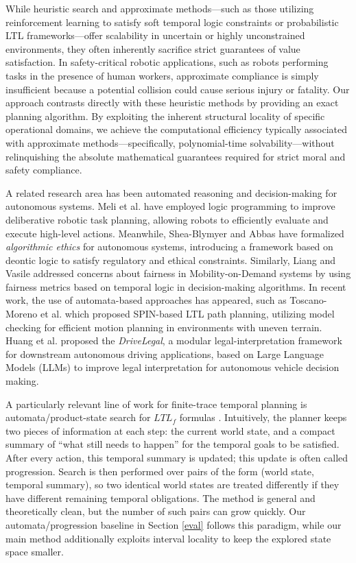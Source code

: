 \documentclass[]{jair}
\begin{document}
While heuristic search and approximate methods—such as those utilizing reinforcement learning to satisfy soft temporal logic constraints or probabilistic LTL frameworks—offer scalability in uncertain or highly unconstrained environments, they often inherently sacrifice strict guarantees of value satisfaction. In safety-critical robotic applications, such as robots performing tasks in the presence of human workers, approximate compliance is simply insufficient because a potential collision could cause serious injury or fatality. Our approach contrasts directly with these heuristic methods by providing an exact planning algorithm. By exploiting the inherent structural locality of specific operational domains, we achieve the computational efficiency typically associated with approximate methods—specifically, polynomial-time solvability—without relinquishing the absolute mathematical guarantees required for strict moral and safety compliance.

A related research area has been automated reasoning and decision-making for autonomous systems. Meli et al. \cite{melilogic} have employed logic programming to improve deliberative robotic task planning, allowing robots to efficiently evaluate and execute high-level actions.
Meanwhile, Shea-Blymyer and Abbas \cite{10.1145/3460975} have formalized {\it algorithmic ethics} for autonomous systems, introducing a framework based on deontic logic \cite{von1951deontic} to satisfy regulatory and ethical constraints. Similarly, 
 Liang and Vasile \cite{fairplanning} addressed concerns about fairness in Mobility-on-Demand systems by using fairness metrics based on temporal logic in decision-making algorithms.
In recent work, the use of automata-based approaches has appeared, such as Toscano-Moreno et al. \cite{li2024spin} which proposed SPIN-based LTL path planning, utilizing model checking for efficient motion planning in environments with uneven terrain. Huang et al. \cite{HUANG2026131593} proposed the \emph{DriveLegal}, a modular legal-interpretation framework for downstream autonomous driving applications, based on Large Language Models (LLMs) to improve legal interpretation for autonomous vehicle decision making.

A particularly relevant line of work for finite-trace temporal planning is automata/product-state search for $LTL_f$ formulas \cite{degiacomo2013ltlf,camacho2018finite}. Intuitively, the planner keeps two pieces of information at each step: the current world state, and a compact summary of ``what still needs to happen'' for the temporal goals to be satisfied. After every action, this temporal summary is updated; this update is often called progression. Search is then performed over pairs of the form (world state, temporal summary), so two identical world states are treated differently if they have different remaining temporal obligations. The method is general and theoretically clean, but the number of such pairs can grow quickly. Our automata/progression baseline in Section \ref{eval} follows this paradigm, while our main method additionally exploits interval locality to keep the explored state space smaller.
\end{document}
